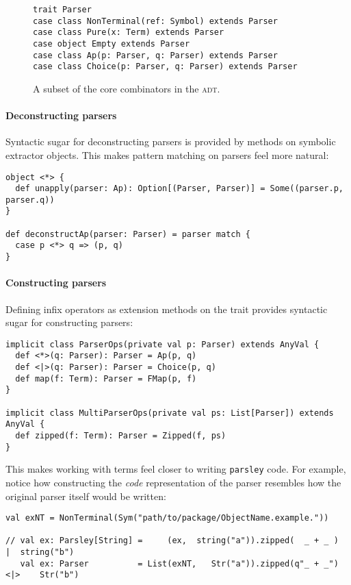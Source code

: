 \documentclass[../../main.tex]{subfiles}
\begin{document}
\begin{figure}[htbp]
\begin{verbatim}
trait Parser
case class NonTerminal(ref: Symbol) extends Parser
case class Pure(x: Term) extends Parser
case object Empty extends Parser
case class Ap(p: Parser, q: Parser) extends Parser
case class Choice(p: Parser, q: Parser) extends Parser
\end{verbatim}
\caption{A subset of the core combinators in the  \textsc{adt}.}
\label{fig:parser-adt}
\end{figure}

\paragraph{Deconstructing parsers}
Syntactic sugar for deconstructing parsers is provided by  methods on symbolic extractor objects.
This makes pattern matching on parsers feel more natural:
\begin{verbatim}
object <*> {
  def unapply(parser: Ap): Option[(Parser, Parser)] = Some((parser.p, parser.q))
}

def deconstructAp(parser: Parser) = parser match {
  case p <*> q => (p, q)
}
\end{verbatim}

\paragraph{Constructing parsers}
Defining infix operators as extension methods on the  trait provides syntactic sugar for constructing parsers:
\begin{verbatim}
implicit class ParserOps(private val p: Parser) extends AnyVal {
  def <*>(q: Parser): Parser = Ap(p, q)
  def <|>(q: Parser): Parser = Choice(p, q)
  def map(f: Term): Parser = FMap(p, f)
}

implicit class MultiParserOps(private val ps: List[Parser]) extends AnyVal {
  def zipped(f: Term): Parser = Zipped(f, ps)
}
\end{verbatim}
%
This makes working with  terms feel closer to writing \texttt{parsley} code.
For example, notice how constructing the \emph{code} representation of the  parser resembles how the original parser itself would be written:
\begin{verbatim}
val exNT = NonTerminal(Sym("path/to/package/ObjectName.example."))  

// val ex: Parsley[String] =     (ex,  string("a")).zipped(  _ + _ )  |  string("b")
   val ex: Parser          = List(exNT,   Str("a")).zipped(q"_ + _") <|>    Str("b")
\end{verbatim}
\end{document}
